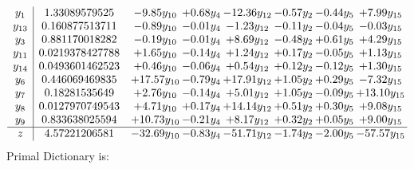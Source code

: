 \documentclass[9pt]{article}
\begin{document}
\[\begin{array}{c| c c@{\hskip 2pt} c@{\hskip 2pt} c@{\hskip 2pt} c@{\hskip 2pt} c@{\hskip 2pt} c@{\hskip 2pt} }
 y_{1}   &  1.33089579525 & -9.85 y_{10} & +  0.68 y_{4} & -12.36 y_{12} & -0.57 y_{2} & -0.44 y_{5} & +  7.99 y_{15}\\
 y_{13}   &  0.160877513711 & -0.89 y_{10} & -0.01 y_{4} & -1.23 y_{12} & -0.11 y_{2} & -0.04 y_{5} & -0.03 y_{15}\\
 y_{3}   &  0.881170018282 & -0.19 y_{10} & -0.01 y_{4} & +  8.69 y_{12} & -0.48 y_{2} & +  0.61 y_{5} & +  4.29 y_{15}\\
 y_{11}   &  0.0219378427788 & +  1.65 y_{10} & -0.14 y_{4} & +  1.24 y_{12} & +  0.17 y_{2} & -0.05 y_{5} & +  1.13 y_{15}\\
 y_{14}   &  0.0493601462523 & +  0.46 y_{10} & -0.06 y_{4} & +  0.54 y_{12} & +  0.12 y_{2} & -0.12 y_{5} & +  1.30 y_{15}\\
 y_{6}   &  0.446069469835 & + 17.57 y_{10} & -0.79 y_{4} & + 17.91 y_{12} & +  1.05 y_{2} & +  0.29 y_{5} & -7.32 y_{15}\\
 y_{7}   &  0.18281535649 & +  2.76 y_{10} & -0.14 y_{4} & +  5.01 y_{12} & +  1.05 y_{2} & -0.09 y_{5} & + 13.10 y_{15}\\
 y_{8}   &  0.0127970749543 & +  4.71 y_{10} & +  0.17 y_{4} & + 14.14 y_{12} & +  0.51 y_{2} & +  0.30 y_{5} & +  9.08 y_{15}\\
 y_{9}   &  0.833638025594 & + 10.73 y_{10} & -0.21 y_{4} & +  8.17 y_{12} & +  0.32 y_{2} & +  0.05 y_{5} & +  9.00 y_{15}\\
\hline
z    &  4.57221206581 & -32.69 y_{10} & -0.83 y_{4} & -51.71 y_{12} & -1.74 y_{2} & -2.00 y_{5} & -57.57 y_{15}\\
\end{array}\]
Primal Dictionary is:
\end{document}
